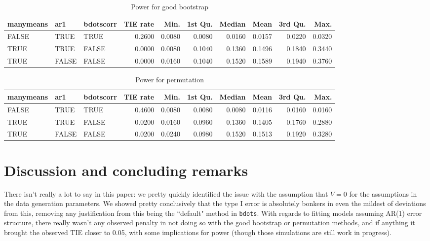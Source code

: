 \documentclass{article}
\newcommand{\xt}{\texttt}
\begin{document}
\begin{table}[ht]
\centering
\begin{tabular}{lllrrrrrrr}
  \hline
manymeans & ar1 & bdotscorr & TIE rate & Min. & 1st Qu. & Median & Mean & 3rd Qu. & Max. \\ 
  \hline
FALSE & TRUE & TRUE & 0.2600 & 0.0080 & 0.0080 & 0.0160 & 0.0157 & 0.0220 & 0.0320 \\ 
  TRUE & TRUE & FALSE & 0.0000 & 0.0080 & 0.1040 & 0.1360 & 0.1496 & 0.1840 & 0.3440 \\ 
  TRUE & FALSE & FALSE & 0.0000 & 0.0160 & 0.1040 & 0.1520 & 0.1589 & 0.1940 & 0.3760 \\ 
   \hline
\end{tabular}
\caption{Power for good bootstrap} 
\label{tab:good_boot_pwr2}
\end{table}

\begin{table}[ht]
\centering
\begin{tabular}{lllrrrrrrr}
  \hline
manymeans & ar1 & bdotscorr & TIE rate & Min. & 1st Qu. & Median & Mean & 3rd Qu. & Max. \\ 
  \hline
FALSE & TRUE & TRUE & 0.4600 & 0.0080 & 0.0080 & 0.0080 & 0.0116 & 0.0160 & 0.0160 \\ 
  TRUE & TRUE & FALSE & 0.0200 & 0.0160 & 0.0960 & 0.1360 & 0.1405 & 0.1760 & 0.2880 \\ 
  TRUE & FALSE & FALSE & 0.0200 & 0.0240 & 0.0980 & 0.1520 & 0.1513 & 0.1920 & 0.3280 \\ 
   \hline
\end{tabular}
\caption{Power for permutation} 
\label{tab:perm_pwr2}
\end{table}


\section{Discussion and concluding remarks}

There isn't really a lot to say in this paper: we pretty quickly identified the issue with the assumption that $V = 0$ for the assumptions in the data generation parameters. We showed pretty conclusively that the type I error is absolutely bonkers in even the mildest of deviations from this, removing any justification from this being the ``default" method in \xt{bdots}. With regards to fitting models assuming AR(1) error structure, there really wasn't any observed penalty in not doing so with the good bootstrap or permutation methods, and if anything it brought the observed TIE closer to 0.05, with some implications for power (though those simulations are still work in progress).
\end{document}
